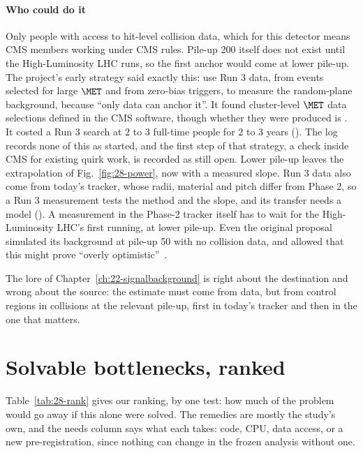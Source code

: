\paragraph{Who could do it}
Only people with access to hit-level collision data, which for this detector means CMS members working under CMS rules. Pile-up 200 itself does not exist until the High-Luminosity LHC runs, so the first anchor would come at lower pile-up. The project's early strategy said exactly this: use Run 3 data, from events selected for large $\MET$ and from zero-bias triggers, to measure the random-plane background, because ``only data can anchor it''. It found cluster-level $\MET$ data selections defined in the CMS software, though whether they were produced is \UNV. It costed a Run 3 search at $2$ to $3$ full-time people for $2$ to $3$ years (\EST). The log records none of this as started, and the first step of that strategy, a check inside CMS for existing quirk work, is recorded as still open. Lower pile-up leaves the extrapolation of Fig.~\ref{fig:28-power}, now with a measured slope. Run 3 data also come from today's tracker, whose radii, material and pitch differ from Phase 2, so a Run 3 measurement tests the method and the slope, and its transfer needs a model (\EST). A measurement in the Phase-2 tracker itself has to wait for the High-Luminosity LHC's first running, at lower pile-up. Even the original proposal simulated its background at pile-up 50 with no collision data, and allowed that this might prove ``overly optimistic''~\cite{Knapen:2017kly}.

The lore of Chapter~\ref{ch:22-signalbackground} is right about the destination and wrong about the source: the estimate must come from data, but from control regions in collisions at the relevant pile-up, first in today's tracker and then in the one that matters.

\section{Solvable bottlenecks, ranked}\label{sec:28-rank}

Table~\ref{tab:28-rank} gives our ranking, by one test: how much of the problem would go away if this alone were solved. The remedies are mostly the study's own, and the needs column says what each takes: code, CPU, data access, or a new pre-registration, since nothing can change in the frozen analysis without one.


